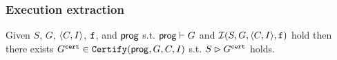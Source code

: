 \documentclass[12pt]{article}
\begin{document}


          





  
    

\subsubsection{Execution extraction}

\begin{lemma}
  Given $S$, $G$, $\langle C, I \rangle$, ${\mathtt{f}}$, and $\mathsf{prog}$ 
  s.t. $\mathsf{prog} \vdash G$ and $\mathcal{I}(S, G, \langle C, I \rangle, {\mathtt{f}})$ hold
  then there exists $G^{{\mathtt{cert}}} \in {\mathtt{Certify}}(\mathsf{prog}, G, C, I)$ s.t.
  $S \rhd G^{{\mathtt{cert}}}$ holds.
\end{lemma}

  
  
\setmonofont[Mapping=tex-text]{CMU Typewriter Text}


\end{document}
